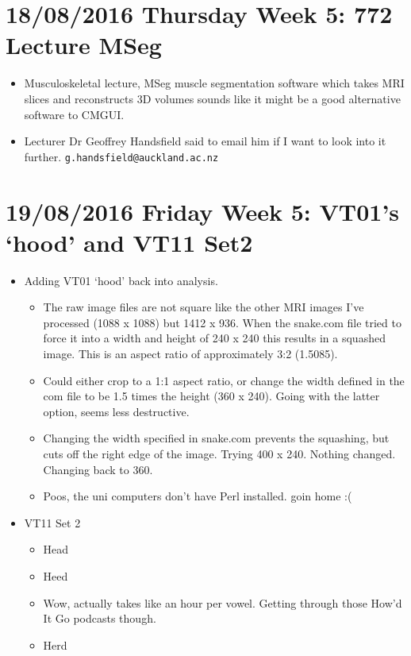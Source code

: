 \documentclass{article}
\begin{document}
\section*{18/08/2016 Thursday Week 5: 772 Lecture MSeg}
\begin{itemize}
    \item Musculoskeletal lecture, MSeg muscle segmentation software which takes MRI slices and reconstructs 3D volumes sounds like it might be a good alternative software to CMGUI.
    \item Lecturer Dr Geoffrey Handsfield said to email him if I want to look into it further. \verb|g.handsfield@auckland.ac.nz|
\end{itemize}

\section*{19/08/2016 Friday Week 5: VT01's `hood' and VT11 Set2}
\begin{itemize}
    \item Adding VT01 `hood' back into analysis.
    \begin{itemize}
        \item The raw image files are not square like the other MRI images I've processed (1088 x 1088) but 1412 x 936. When the snake.com file tried to force it into a width and height of 240 x 240 this results in a squashed image. This is an aspect ratio of approximately 3:2 (1.5085).
        \item Could either crop to a 1:1 aspect ratio, or change the width defined in the com file to be 1.5 times the height (360 x 240). Going with the latter option, seems less destructive.
        \item Changing the width specified in snake.com prevents the squashing, but cuts off the right edge of the image. Trying 400 x 240. Nothing changed. Changing back to 360.
        \item Poos, the uni computers don't have Perl installed. goin home :(
    \end{itemize}
    \item VT11 Set 2
    \begin{itemize}
        \item Head
        \item Heed
        \item Wow, actually takes like an hour per vowel. Getting through those How'd It Go podcasts though.
        \item Herd
    \end{itemize}
\end{itemize}
\end{document}
